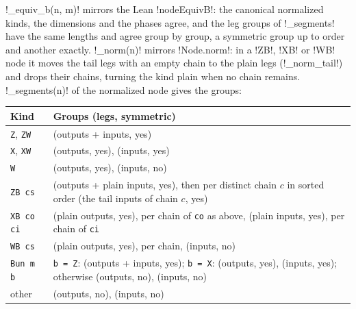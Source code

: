 {\py!_equiv_b(n, m)! mirrors the Lean \lean!nodeEquivB!: the canonical normalized kinds, the
dimensions and the phases agree, and the leg groups of \py!_segments! have the same lengths and
agree group by group, a symmetric group up to order and another exactly.
\py!_norm(n)! mirrors \lean!Node.norm!: in a \code!ZB!, \code!XB! or \code!WB! node it moves the
tail legs with an empty chain to the plain legs (\py!_norm_tail!) and drops their chains, turning
the kind plain when no chain remains. \py!_segments(n)! of the normalized node gives the groups:

\begin{xltabular}{\linewidth}{@{}p{3cm}X@{}}
\toprule
Kind & Groups (legs, symmetric) \\
\midrule
\texttt{Z}, \texttt{ZW} & (outputs + inputs, yes) \\
\texttt{X}, \texttt{XW} & (outputs, yes), (inputs, yes) \\
\texttt{W} & (outputs, yes), (inputs, no) \\
\texttt{ZB cs} & (outputs + plain inputs, yes), then per distinct chain $c$ in sorted order
  (the tail inputs of chain $c$, yes) \\
\texttt{XB co ci} & (plain outputs, yes), per chain of \texttt{co} as above, (plain inputs, yes),
  per chain of \texttt{ci} \\
\texttt{WB cs} & (plain outputs, yes), per chain, (inputs, no) \\
\texttt{Bun m b} & \texttt{b = Z}: (outputs + inputs, yes); \texttt{b = X}: (outputs, yes),
  (inputs, yes); otherwise (outputs, no), (inputs, no) \\
other & (outputs, no), (inputs, no) \\
\bottomrule
\end{xltabular}

}
